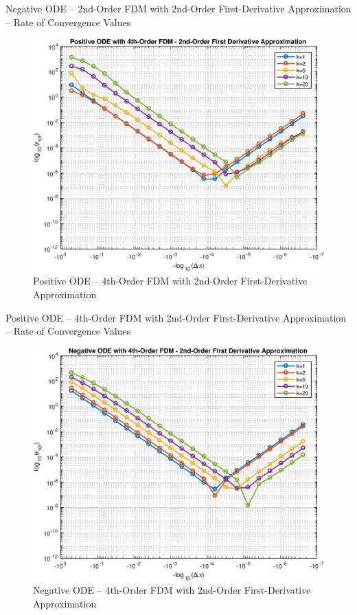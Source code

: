 \documentclass[10pt, reqno]{article}		%
\numberwithin{equation}{section}
\begin{document}
\vfill

\begin{table}[H]
	
	\caption{Negative ODE -- 2nd-Order FDM with 2nd-Order First-Derivative Approximation -- Rate of Convergence Values}	
\end{table}

\begin{figure}[H]
	\begin{center}
		\includegraphics[width = 0.76\linewidth]{positive_ode_order_4_fd_order_2}
		\caption{Positive ODE -- 4th-Order FDM with 2nd-Order First-Derivative Approximation}	
	\end{center}
\end{figure}

\vfill

\begin{table}[H]
	
	\caption{Positive ODE -- 4th-Order FDM with 2nd-Order First-Derivative Approximation -- Rate of Convergence Values}	
\end{table}

\begin{figure}[H]
	\begin{center}
		\includegraphics[width = 0.76\linewidth]{negative_ode_order_4_fd_order_2}
		\caption{Negative ODE -- 4th-Order FDM with 2nd-Order First-Derivative Approximation}	
	\end{center}
\end{figure}
\end{document}
